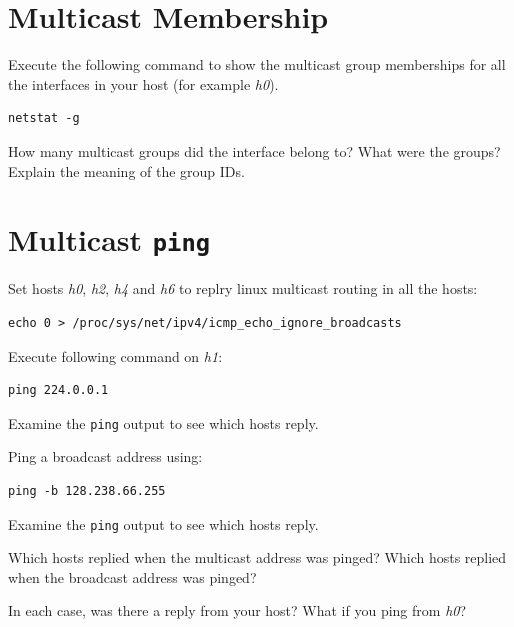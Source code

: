 \documentclass{../UTNetLab}
\begin{document}
\section{Multicast Membership}
    Execute the following command to show the multicast group memberships for all the interfaces in your host (for example \textit{h0}).
    \begin{lstlisting}
netstat -g
    \end{lstlisting}
    
    \begin{report}
    \item How many multicast groups did the interface belong to? What were the groups? Explain the meaning of the group IDs.
    \end{report}

\section{Multicast \texttt{ping}}
    Set hosts \textit{h0}, \textit{h2}, \textit{h4} and \textit{h6} to replry linux multicast routing in all the hosts:
    \begin{lstlisting}[emph={eth0}]
echo 0 > /proc/sys/net/ipv4/icmp_echo_ignore_broadcasts
    \end{lstlisting}

    Execute following command on \textit{h1}:
    \begin{lstlisting}
ping 224.0.0.1
    \end{lstlisting}
    Examine the \lstinline{ping} output to see which hosts reply.

    Ping a broadcast address using:
    \begin{lstlisting}
ping -b 128.238.66.255
    \end{lstlisting}
    Examine the \lstinline{ping} output to see which hosts reply.

    
    \begin{report}
    \item Which hosts replied when the multicast address was pinged?
    Which hosts replied when the broadcast address was pinged?

    \item In each case, was there a reply from your host?
    What if you ping from \textit{h0}?
    \end{report}
\end{document}
